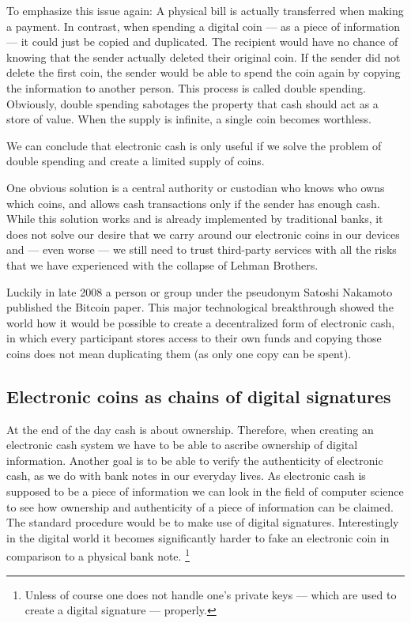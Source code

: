 \documentclass[a4paper,12pt,oneside,openany]{book}
\begin{document}
To emphasize this issue again: A physical bill is actually transferred when making a payment. In contrast, when spending a digital coin --- as a piece of information --- it could just be copied and duplicated.
The recipient would have no chance of knowing that the sender actually deleted their original coin.
If the sender did not delete the first coin, the sender would be able to spend the coin again by copying the information to another person.
This process is called double spending.
Obviously, double spending sabotages the property that cash should act as a store of value. When the supply is infinite, a single coin becomes worthless. 

We can conclude that electronic cash is only useful if we solve the problem of double spending and create a limited supply of coins.

One obvious solution is a central authority or custodian who knows who owns which coins, and allows cash transactions only if the sender has enough cash.
While this solution works and is already implemented by traditional banks, it does not solve our desire that we carry around our electronic coins in our devices and --- even worse --- we still need to trust third-party services with all the risks that we have experienced with the collapse of Lehman Brothers.

Luckily in late 2008 a person or group under the pseudonym Satoshi Nakamoto published the Bitcoin paper.
This major technological breakthrough showed the world how it would be possible to create a decentralized form of electronic cash, in which every participant stores access to their own funds and copying those coins does not mean duplicating them (as only one copy can be spent).

\subsection{Electronic coins as chains of digital signatures}
At the end of the day cash is about ownership.
Therefore, when creating an electronic cash system we have to be able to ascribe ownership of digital information. 
Another goal is to be able to verify the authenticity of electronic cash, as we do with bank notes in our everyday lives.
As electronic cash is supposed to be a piece of information we can look in the field of computer science to see how ownership and authenticity of a piece of information can be claimed.
The standard procedure would be to make use of \gls{digital signature}s.
Interestingly in the digital world it becomes significantly harder to fake an electronic coin in comparison to a physical bank note.
\footnote{Unless of course one does not handle one's private keys --- which are used to create a digital signature --- properly.}
\end{document}
